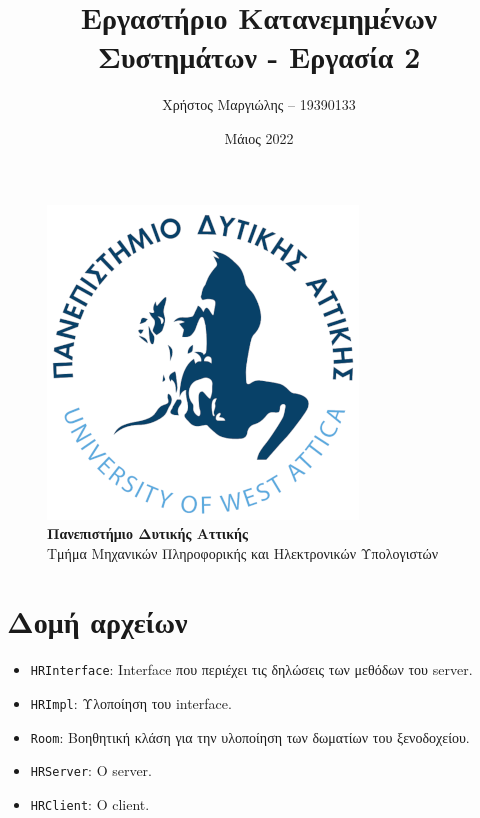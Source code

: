 \documentclass{article}
\title{Εργαστήριο Κατανεμημένων Συστημάτων - Εργασία 2}
\author{Χρήστος Μαργιώλης -- 19390133}
\date{Μάιος 2022}
\begin{document}
\begin{titlepage}
        \maketitle
        \begin{figure}[t!]
        \begin{center}
        \includegraphics[scale=0.3]{./res/uniwalogo.png} \\
        \Large
        \textbf{Πανεπιστήμιο Δυτικής Αττικής} \\
        \large
        Τμήμα Μηχανικών Πληροφορικής και Ηλεκτρονικών Υπολογιστών
        \end{center}
        \end{figure}
\end{titlepage}

\renewcommand{\contentsname}{Περιεχόμενα}
\tableofcontents

\section{Δομή αρχείων}

\begin{itemize}
	\item \lstinline{HRInterface}: Interface που περιέχει τις δηλώσεις των
		μεθόδων του server.
	\item \lstinline{HRImpl}: Υλοποίηση του interface.
	\item \lstinline{Room}: Βοηθητική κλάση για την υλοποίηση των δωματίων
		του ξενοδοχείου.
	\item \lstinline{HRServer}: Ο server.
	\item \lstinline{HRClient}: Ο client.
\end{itemize}
\end{document}
